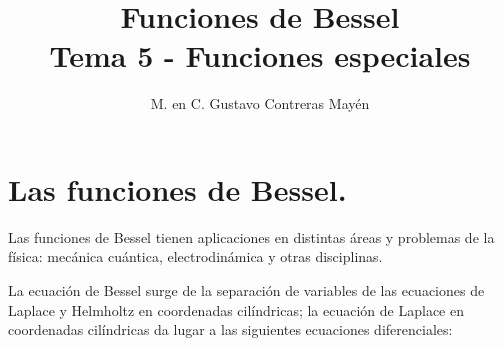 
\title{Funciones de Bessel \\ \large {Tema 5 - Funciones especiales} \vspace{-3ex}}
\author{M. en C. Gustavo Contreras Mayén}
\date{ }

\pagestyle{fancy}
\fancyhf{}
\lhead{\leftmark}
\rfoot{\thepage}
\setlength{\headheight}{16pt}%

\def\changemargin#1#2{\list{}{\rightmargin#2\leftmargin#1}\item[]}
\let\endchangemargin=\endlist 



\maketitle
\fontsize{14}{14}\selectfont
\tableofcontents
\newpage


\section{Las funciones de Bessel.}

Las funciones de Bessel tienen aplicaciones en distintas áreas y problemas de la física: mecánica cuántica, electrodinámica y otras disciplinas.
\par
La ecuación de Bessel surge de la separación de variables de las ecuaciones de Laplace y Helmholtz en coordenadas cilíndricas; la ecuación de Laplace en coordenadas cilíndricas da lugar a las siguientes ecuaciones diferenciales:

